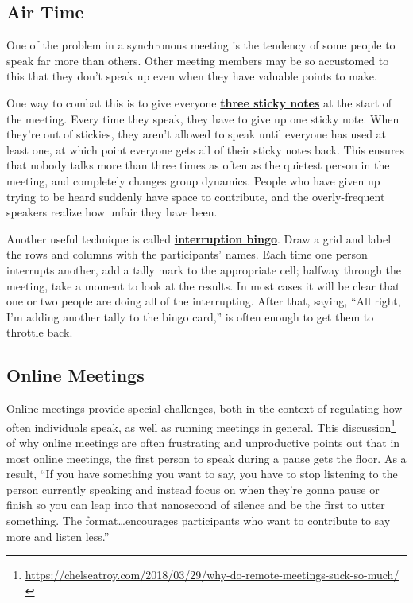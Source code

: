 \documentclass[
]{krantz}
\renewcommand{\href}[2]{#2\footnote{\url{#1}}}
\newcommand{\gref}[2]{\hyperlink{#2}{\textbf{#1}}}
\begin{document}
\hypertarget{teams-fair}{%
\subsection{Air Time}\label{teams-fair}}

One of the problem in a synchronous meeting
is the tendency of some people to speak far more than others.
Other meeting members may be so accustomed to this
that they don't speak up even when they have valuable points to make.

One way to combat this is to give everyone \gref{three sticky notes}{three\_stickies}
at the start of the meeting.
Every time they speak,
they have to give up one sticky note.
When they're out of stickies,
they aren't allowed to speak until everyone has used at least one,
at which point everyone gets all of their sticky notes back.
This ensures that nobody talks more than three times as often as
the quietest person in the meeting,
and completely changes group dynamics.
People who have given up trying to be heard
suddenly have space to contribute,
and the overly-frequent speakers realize how unfair they have been.

Another useful technique is called \gref{interruption bingo}{interruption\_bingo}.
Draw a grid and label the rows and columns with the participants' names.
Each time one person interrupts another,
add a tally mark to the appropriate cell;
halfway through the meeting,
take a moment to look at the results.
In most cases it will be clear that
one or two people are doing all of the interrupting.
After that, saying, ``All right, I'm adding another tally to the bingo card,''
is often enough to get them to throttle back.

\hypertarget{teams-online}{%
\subsection{Online Meetings}\label{teams-online}}

Online meetings provide special challenges,
both in the context of regulating how often individuals speak,
as well as running meetings in general.
\href{https://chelseatroy.com/2018/03/29/why-do-remote-meetings-suck-so-much/}{This discussion} of why online meetings are often frustrating and unproductive
points out that in most online meetings,
the first person to speak during a pause gets the floor.
As a result,
``If you have something you want to say,
you have to stop listening to the person currently speaking
and instead focus on when they're gonna pause or finish
so you can leap into that nanosecond of silence and be the first to utter something.
The format\ldots encourages participants who want to contribute
to say more and listen less.''
\end{document}
